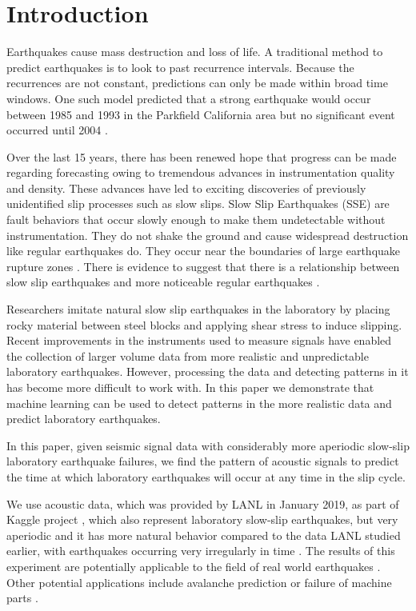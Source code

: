 \documentclass[]{llncs} %
\begin{document}
\section{Introduction}
Earthquakes cause mass destruction and loss of life. A traditional method to predict earthquakes is to look to past recurrence intervals. Because the recurrences are not constant, predictions can only be made within broad time windows. One such model predicted that a strong earthquake would occur between 1985 and 1993 in the Parkfield California area but no significant event occurred until 2004 \cite{Jackson}. \par

Over the last 15 years, there has been renewed hope that progress can be made regarding forecasting owing to tremendous advances in instrumentation quality and density. These advances have led to exciting discoveries of previously unidentified slip processes such as slow slips. Slow Slip Earthquakes (SSE) are fault behaviors that occur slowly enough to make them undetectable without instrumentation. They do not shake the ground and cause widespread destruction like regular earthquakes do. They occur near the boundaries of large earthquake rupture zones \cite{Slip}. There is evidence to suggest that there is a relationship between slow slip earthquakes and more noticeable regular earthquakes \cite{SlowSlip}. \par

Researchers imitate natural  slow slip earthquakes in the laboratory by placing rocky material between steel blocks and applying shear stress to induce slipping. Recent improvements in the instruments \cite{kaggle} used to measure signals have enabled the collection of larger volume data from more realistic and unpredictable laboratory earthquakes. However, processing the data and detecting patterns in it has become more difficult to work with. In this paper we demonstrate that machine learning can be used to detect patterns in the more realistic data and predict laboratory earthquakes. \par

In this paper, given seismic signal data with considerably more aperiodic slow-slip laboratory earthquake failures, we find the pattern of  acoustic signals to predict the time at which  laboratory earthquakes will occur at any time in the slip cycle. \par

We use acoustic data, which was provided by LANL in January 2019, as part of Kaggle project \cite{kaggle}, which also represent laboratory slow-slip earthquakes, but very aperiodic and it has more natural behavior compared to the data LANL studied earlier, with earthquakes occurring very irregularly in time \cite{kaggle}. The results of this experiment are potentially applicable to the field of real world earthquakes \cite{Bertrand}. Other potential applications include avalanche prediction or failure of machine parts \cite{Bertrand}. \par
\end{document}
